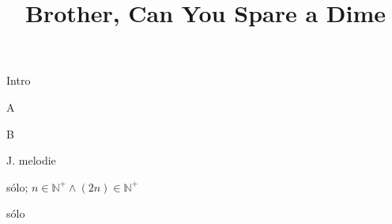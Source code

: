 \documentclass[timestamp]{jazzgrid}
\title{Brother, Can You Spare a Dime}
\begin{document}
\maketitle
\begin{musicsection}{Intro}
\barline
	{\barfour{}
		{}
		{}
		{}
		{}
	}
	{\barfour{}
		{}
		{}
		{}
		{}
	}
	{\barfour{}
		{}
		{}
		{}
		{}
	}
	{\barfour{}
		{}
		{}
		{}
		{}
	}
\barline
	{\barfour{}
		{}
		{}
		{}
		{}
	}
	{\barfour{}
		{}
		{}
		{}
		{}
	}
	{\barfour{}
		{}
		{}
		{}
		{}
	}
	{\barfour{}
		{}
		{}
		{}
		{}
	}
\barline
	{\barfour{}
		{}
		{}
		{}
		{}
	}
	{\barfour{}
		{}
		{}
		{}
		{}
	}
	{\barfour{}
		{}
		{}
		{}
		{}
	}
	{\barfour{}
		{}
		{}
		{}
		{}
	}
\barline
	{\barfour{}
		{}
		{}
		{}
		{}
	}
	{\barfour{}
		{}
		{}
		{}
		{}
	}
	{\barfour{}
		{}
		{}
		{}
		{}
	}
	{\barfour{}
		{}
		{}
		{}
		{}
	}
\end{musicsection}
\begin{musicsection}{A}
\barline
	{\barfour{}
		{}
		{}
		{}
		{}
	}
	{\barfour{}
		{}
		{}
		{}
		{}
	}
	{\barfour{}
		{}
		{}
		{}
		{}
	}
	{\barfour{}
		{}
		{}
		{}
		{}
	}
\barline
	{\barfour{}
		{}
		{}
		{}
		{}
	}
	{\barfour{}
		{}
		{}
		{}
		{}
	}
	{\barfour{}
		{}
		{}
		{}
		{}
	}
	{
		{}
		{}
		{}
		{}
	}
	{
		{}
		{}
		{}
		{}
	}
\end{musicsection}
\begin{musicsection}{B}
\barline
	{\barfour{}
		{}
		{}
		{}
		{}
	}
	{\barfour{}
		{}
		{}
		{}
		{}
	}
	{\barfour{}
		{}
		{}
		{}
		{}
	}
	{\barfour{}
		{}
		{}
		{}
		{}
	}
\barline
	{\barfour{}
		{}
		{}
		{}
		{}
	}
	{\barfour{}
		{}
		{}
		{}
		{}
	}
	{\barfour{}
		{}
		{}
		{}
		{}
	}
	{\barfour{}
		{}
		{}
		{}
		{}
	}
\end{musicsection}
\begin{multicols*}{2}
\scriptsize
\begin{description}[noitemsep,align=right,labelwidth=\widthof{\bfseries{AABABA}}]
	\item [Intro]
	\item [AABABA] J. melodie
	\item [{$[$AA$]_n$}] sólo; $n \in \mathbb{N}^+ \land (2n) \in \mathbb{N}^+$
	\item [BA] sólo
\end{description}
\end{multicols*}
\end{document}
